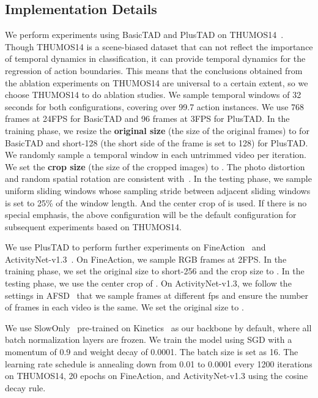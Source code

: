 \documentclass[a4paper,fleqn]{cas-dc}
\begin{document}
\noindent 
\subsection{Implementation Details}
We perform experiments using BasicTAD and PlusTAD on THUMOS14~\citep{THUMOS14}. Though THUMOS14 is a scene-biased dataset that can not reflect the importance of temporal dynamics in classification, it can provide temporal dynamics for the regression of action boundaries. This means that the conclusions obtained from the ablation experiments on THUMOS14 are universal to a certain extent, so we choose THUMOS14 to do ablation studies. 
We sample temporal windows of 32 seconds for both configurations, covering over 99.7 action instances. 
We use 768 frames at 24FPS for BasicTAD and 96 frames at 3FPS for PlusTAD. 
In the training phase, we resize the \textbf{original size} (the size of the original frames) to  for BasicTAD and short-128 (the short side of the frame is set to 128) for PlusTAD. 
We randomly sample a temporal window in each untrimmed video per iteration.
We set the \textbf{crop size} (the size of the cropped images) to . 
The photo distortion and random spatial rotation are consistent with~\citep{rgb_enough,ssd}.
In the testing phase, we sample uniform sliding windows whose sampling stride between adjacent sliding windows is set to 25\% of the window length. 
And the center crop of  is used. 
If there is no special emphasis, the above configuration will be the default configuration for subsequent experiments based on THUMOS14.

We use PlusTAD to perform further experiments on FineAction~\citep{fineaction} and ActivityNet-v1.3~\citep{anet}.
On FineAction, we sample RGB frames at 2FPS. 
In the training phase, we set the original size to short-256 and the crop size to .
In the testing phase, we use the center crop of .
On ActivityNet-v1.3, we follow the settings in AFSD~\citep{afsd} that we sample frames at different fps and ensure the number of frames in each video is the same. We set the original size to .


We use SlowOnly~\citep{slowfast} pre-trained on Kinetics~\citep{kinetics} as our backbone by default, where all batch normalization layers are frozen.
We train the model using SGD with a momentum of 0.9 and weight decay of 0.0001. The batch size is set as 16.
The learning rate schedule is annealing down from 0.01 to 0.0001 every 1200 iterations on THUMOS14, 20 epochs on FineAction, and ActivityNet-v1.3 using the cosine decay rule.
\end{document}
